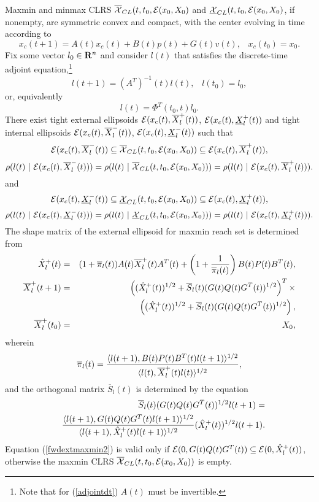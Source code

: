 Maxmin and minmax CLRS $\OXCL(t, t_0, \EE(x_0, X_0)$ and
$\UXCL(t, t_0, \EE(x_0, X_0)$, if nonempty, are symmetric convex and compact,
with the center evolving in time according to
\begin{equation}
x_c(t+1) = A(t)x_c(t) + B(t)p(t) + G(t)v(t), \;\;\; x_c(t_0)=x_0.
\label{fwdcenterd}
\end{equation}
Fix some vector $l_0\in{\bf R}^n$ and consider $l(t)$ that satisfies the
discrete-time adjoint equation,\footnote{Note that for (\ref{adjointdt})
$A(t)$ must be invertible.}
\begin{equation}
l(t+1) = \left(A^T\right)^{-1}(t)l(t), \;\;\; l(t_0) = l_0,
\label{adjointdt}
\end{equation}
or, equivalently
\[ l(t) = \Phi^T(t_0, t)l_0 .\]
There exist tight external ellipsoids
$\EE(x_c(t), \OXP(t))$, $\EE(x_c(t), \UXP(t))$ and tight internal
ellipsoids
$\EE(x_c(t), \OXM(t))$, $\EE(x_c(t), \UXM(t))$ such that
\begin{equation}
\EE(x_c(t), \OXM(t))\subseteq\OXCL(t,t_0,\EE(x_0,X_0))
\subseteq \EE(x_c(t), \OXP(t)),
\label{maxmininclusion}
\end{equation}
\begin{equation}
\rho(l(t) ~|~ \EE(x_c(t), \OXM(t))) =
\rho(l(t) ~|~ \OXCL(t, t_0, \EE(x_0,X_0))) =
\rho(l(t) ~|~ \EE(x_c(t), \OXP(t))) .
\label{maxmintightness}
\end{equation}
and
\begin{equation}
\EE(x_c(t), \UXM(t))\subseteq\UXCL(t,t_0,\EE(x_0,X_0))
\subseteq \EE(x_c(t), \UXP(t)),
\label{minmaxinclusion}
\end{equation}
\begin{equation}
\rho(l(t) ~|~ \EE(x_c(t), \UXM(t))) =
\rho(l(t) ~|~ \UXCL(t, t_0, \EE(x_0,X_0))) =
\rho(l(t) ~|~ \EE(x_c(t), \UXP(t))) .
\label{minmaxtightness}
\end{equation}
The shape matrix of the external ellipsoid for maxmin reach set
is determined from
\begin{eqnarray}
\OOXP(t) & = & (1+\overline{\pi}_l(t))A(t)\OXP(t)A^T(t) +
\left(1+\frac{1}{\overline{\pi}_l(t)}\right)
B(t)P(t)B^T(t), \label{fwdextmaxmin1} \\
\OXP(t+1) & = & \left((\OOXP(t))^{1/2} +
\overline{S}_l(t)(G(t)Q(t)G^T(t))^{1/2}\right)^T
\times \nonumber \\
& &\left((\OOXP(t))^{1/2} + \overline{S}_l(t)(G(t)Q(t)G^T(t))^{1/2}\right),
\label{fwdextmaxmin2}\\
\OXP(t_0) & = & X_0, \label{fwdextmaxmin3}
\end{eqnarray}
wherein
\[ \overline{\pi}_l(t) = \frac{\langle l(t+1),
B(t)P(t)B^T(t)l(t+1)\rangle^{1/2}}{\langle l(t),
\OXP(t)l(t)\rangle^{1/2}}, \]
and the orthogonal matrix $\overline{S}_l(t)$ is determined by the equation
\begin{eqnarray*}
& & \overline{S}_l(t)(G(t)Q(t)G^T(t))^{1/2}l(t+1) = \\
& & \frac{\langle l(t+1),
G(t)Q(t)G^T(t)l(t+1)\rangle^{1/2}}{\langle l(t+1),
\OOXP(t)l(t+1)\rangle^{1/2}}(\OOXP(t))^{1/2}l(t+1).
\end{eqnarray*}
Equation (\ref{fwdextmaxmin2}) is valid only if
$\EE(0,G(t)Q(t)G^T(t))\subseteq\EE(0,\OOXP(t))$, otherwise the
maxmin CLRS $\OXCL(t,t_0,\EE(x_0,X_0))$ is empty.

